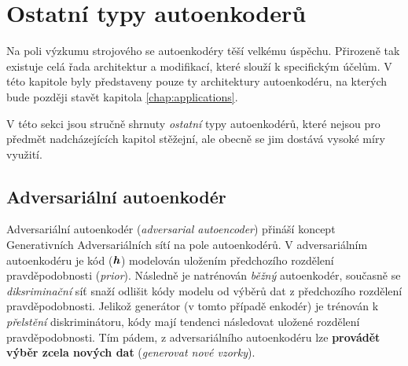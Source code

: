 \section{Ostatní typy autoenkoderů}
Na poli výzkumu strojového se autoenkodéry těší velkému úspěchu. Přirozeně tak existuje celá řada architektur a modifikací, které slouží k specifickým účelům.
V této kapitole byly představeny pouze ty architektury autoenkodéru, na kterých bude později stavět kapitola \autoref{chap:applications}.

V této sekci jsou stručně shrnuty \emph{ostatní} typy autoenkodérů, které nejsou pro předmět nadcházejících kapitol stěžejní, ale obecně se jim dostává vysoké míry využití.

\subsection{Adversariální autoenkodér}
Adversariální autoenkodér (\emph{adversarial autoencoder}) přináší koncept Generativních Adversariálních sítí \cite{Goodfellow2014} na pole autoenkodérů.
V adversariálním autoenkodéru je kód ($\textbf{\emph{h}}$) modelován uložením předchozího rozdělení pravděpodobnosti (\emph{prior}).
Následně je natrénován \emph{běžný} autoenkodér, současně se \emph{diksriminační} síť snaží odlišit kódy modelu od výběrů dat z předchozího rozdělení pravděpodobnosti.
Jelikož generátor (v tomto případě enkodér) je trénován k \emph{přelstění} diskriminátoru, kódy mají tendenci následovat uložené rozdělení pravděpodobnosti.
Tím pádem, z adversariálního autoenkodéru lze \textbf{provádět výběr zcela nových dat} (\emph{generovat nové vzorky}). \cite{Charte2018}

